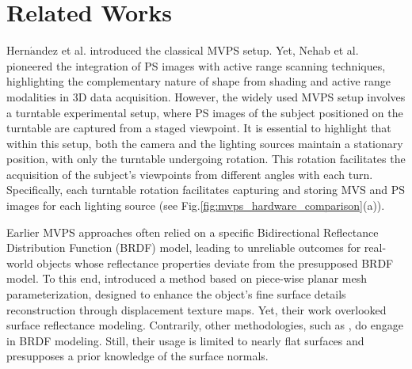 \section{Related Works}
\label{sec:relatedworks}
Hern${\acute{\text{a}}}$ndez et al. \citep{hernandez2008multiview} introduced the classical MVPS setup. Yet, Nehab et al. \citep{nehab2005efficiently} pioneered the integration of PS images with active range scanning techniques, highlighting the complementary nature of shape from shading and active range modalities in 3D data acquisition. However, the widely used MVPS setup involves a turntable experimental setup, where PS images of the subject positioned on the turntable are captured from a staged viewpoint. It is essential to highlight that within this setup, both the camera and the lighting sources maintain a stationary position, with only the turntable undergoing rotation. This rotation facilitates the acquisition of the subject's viewpoints from different angles with each turn. Specifically, each turntable rotation facilitates capturing and storing MVS and PS images for each lighting source (see Fig.\ref{fig:mvps_hardware_comparison}(a)). 

\vspace{-0.3cm}
Earlier MVPS approaches often relied on a specific Bidirectional Reflectance Distribution Function (BRDF) model, leading to unreliable outcomes for real-world objects whose reflectance properties deviate from the presupposed BRDF model. To this end, \citep{park2016robust} introduced a method based on piece-wise planar mesh parameterization, designed to enhance the object's fine surface details reconstruction through displacement texture maps. Yet, their work overlooked surface reflectance modeling. Contrarily, other methodologies, such as \citep{ren2011pocket, dong2010manifold}, do engage in BRDF modeling. Still, their usage is limited to nearly flat surfaces and presupposes a prior knowledge of the surface normals.


